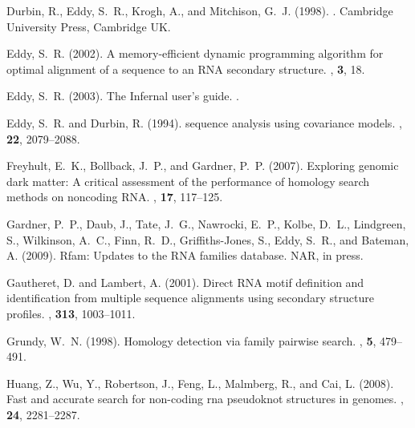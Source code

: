 \documentclass{bioinfo}
\begin{document}
\begin{application}
\begin{thebibliography}{}
Durbin, R., Eddy, S.~R., Krogh, A., and Mitchison, G.~J. (1998).
.
\newblock Cambridge University Press, Cambridge UK.

Eddy, S.~R. (2002).
\newblock A memory-efficient dynamic programming algorithm for optimal
  alignment of a sequence to an {RNA} secondary structure.
, {\bf 3}, 18.

Eddy, S.~R. (2003).
\newblock The {I}nfernal user's guide.
.

Eddy, S.~R. and Durbin, R. (1994).
 sequence analysis using covariance models.
, {\bf 22}, 2079--2088.

Freyhult, E.~K., Bollback, J.~P., and Gardner, P.~P. (2007).
\newblock Exploring genomic dark matter: A critical assessment of the
  performance of homology search methods on noncoding {RNA}.
, {\bf 17}, 117--125.

Gardner, P.~P., Daub, J., Tate, J.~G., Nawrocki, E.~P., Kolbe, D.~L.,
  Lindgreen, S., Wilkinson, A.~C., Finn, R.~D., Griffiths-Jones, S., Eddy,
  S.~R., and Bateman, A. (2009).
\newblock Rfam: Updates to the {RNA} families database.
\newblock NAR, in press.

Gautheret, D. and Lambert, A. (2001).
\newblock Direct {RNA} motif definition and identification from multiple
  sequence alignments using secondary structure profiles.
, {\bf 313}, 1003--1011.

Grundy, W.~N. (1998).
\newblock Homology detection via family pairwise search.
, {\bf 5}, 479--491.

Huang, Z., Wu, Y., Robertson, J., Feng, L., Malmberg, R., and Cai, L. (2008).
\newblock Fast and accurate search for non-coding rna pseudoknot structures in
  genomes.
, {\bf 24}, 2281--2287.


\end{thebibliography}
\end{application}
\end{document}
